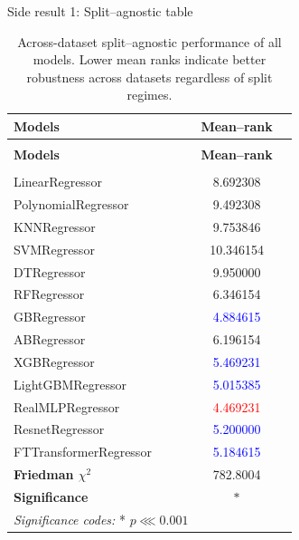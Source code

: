 \begin{frame}{Side result 1: Split–agnostic table}
    \tiny
    \begin{longtable}{lcc}
    \caption{Across-dataset split–agnostic performance of all models. Lower mean ranks indicate better robustness across datasets regardless of split regimes.}
    \label{tab:split_agnostic_rank_another} \\
    \toprule
    \textbf{Models} &
    \textbf{Mean–rank} \\
    \midrule
    \endfirsthead

    \multicolumn{1}{c}{} \\
    \toprule
    \textbf{Models} &
    \textbf{Mean–rank} \\
    \midrule
    \endhead

    \midrule
    \multicolumn{1}{r}{} \\
    \endfoot

    \bottomrule
    \endlastfoot

    LinearRegressor & 8.692308 \\

    PolynomialRegressor & 9.492308 \\

    KNNRegressor & 9.753846 \\

    SVMRegressor & 10.346154 \\

    DTRegressor & 9.950000 \\

    RFRegressor & 6.346154 \\

    GBRegressor & \textcolor{blue}{4.884615} \\

    ABRegressor & 6.196154 \\

    XGBRegressor & \textcolor{blue}{5.469231} \\

    LightGBMRegressor & \textcolor{blue}{5.015385} \\

    RealMLPRegressor & \textcolor{red}{4.469231} \\

    ResnetRegressor & \textcolor{blue}{5.200000} \\

    FTTransformerRegressor & \textcolor{blue}{5.184615} \\

    \addlinespace
    \midrule
    \textbf{Friedman $\chi^2$} &
    782.8004 \\

    \textbf{Significance} &
    $\ast$ \\

    \multicolumn{1}{l}{\footnotesize
    \tiny \textit{Significance codes:} * $p \lll  0.001$}
    \\

    \end{longtable}
\end{frame}


